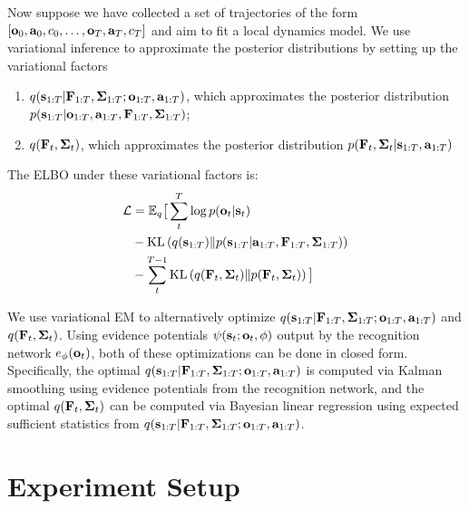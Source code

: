 Now suppose we have collected a set of trajectories of the form $\left[\mathbf{o}_0,\mathbf{a}_0,c_0,\ldots,\mathbf{o}_{T},\mathbf{a}_{T},c_{T}\right]$ and aim to fit a local dynamics model. We use variational inference to approximate the posterior distributions by setting up the variational factors
\vspace{-.5em}
\begin{enumerate}
    \itemsep0em
    \item $q(\mathbf{s}_{1:T} | \mathbf{F}_{1:T}, \bm{\Sigma}_{1:T}; \mathbf{o}_{1:T}, \mathbf{a}_{1:T})$, which approximates the posterior distribution $p(\mathbf{s}_{1:T} | \mathbf{o}_{1:T}, \mathbf{a}_{1:T}, \mathbf{F}_{1:T}, \bm{\Sigma}_{1:T})$;
    \item $q(\mathbf{F}_t, \bm{\Sigma}_t)$, which approximates the posterior distribution $p(\mathbf{F}_t, \bm{\Sigma}_t | \mathbf{s}_{1:T}, \mathbf{a}_{1:T})$
\end{enumerate}
\vspace{-.5em}
The ELBO under these variational factors is:
\begin{align*}
    \mathcal{L} &= \mathbb{E}_q \big[\sum_t^T \log p(\mathbf{o}_t | \mathbf{s}_t)\\ &- \mathrm{KL}\left(q(\mathbf{s}_{1:T})\|p(\mathbf{s}_{1:T} | \mathbf{a}_{1:T}, \mathbf{F}_{1:T}, \bm{\Sigma}_{1:T})\right)\\
    &- \sum_t^{T - 1} \mathrm{KL}\left(q(\mathbf{F}_t, \bm{\Sigma}_t)\|p(\mathbf{F}_t, \bm{\Sigma}_t)\right)
    \big]
\end{align*}

We use variational EM to alternatively optimize $q(\mathbf{s}_{1:T} | \mathbf{F}_{1:T}, \bm{\Sigma}_{1:T}; \mathbf{o}_{1:T}, \mathbf{a}_{1:T})$ and $q(\mathbf{F}_t, \bm{\Sigma}_t)$. Using evidence potentials $\psi(\mathbf{s}_t;\mathbf{o}_t,\phi)$ output by the recognition network $e_\phi(\mathbf{o}_t)$, both of these optimizations can be done in closed form. Specifically, the optimal $q(\mathbf{s}_{1:T} | \mathbf{F}_{1:T}, \bm{\Sigma}_{1:T}; \mathbf{o}_{1:T}, \mathbf{a}_{1:T})$ is computed via Kalman smoothing using evidence potentials from the recognition network, and the optimal $q(\mathbf{F}_t, \bm{\Sigma}_t)$ can be computed via Bayesian linear regression using expected sufficient statistics from $q(\mathbf{s}_{1:T} | \mathbf{F}_{1:T}, \bm{\Sigma}_{1:T}; \mathbf{o}_{1:T}, \mathbf{a}_{1:T})$.


\section{Experiment Setup}
\label{sec:supp-set}

